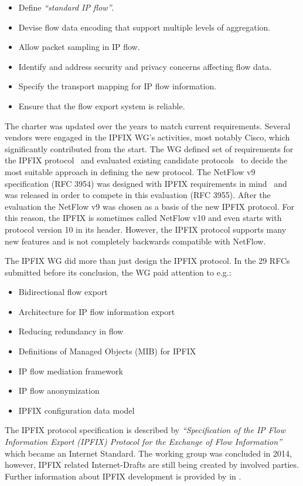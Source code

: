 \begin{itemize}
    \item Define \emph{``standard IP flow''}.
    \item Devise flow data encoding that support multiple levels of aggregation.
    \item Allow packet sampling in IP flow.
    \item Identify and address security and privacy concerns affecting flow data.
    \item Specify the transport mapping for IP flow information.
    \item Ensure that the flow export system is reliable.
\end{itemize}

The charter was updated over the years to match current requirements. Several vendors were engaged in the IPFIX WG’s activities, most notably Cisco, which significantly contributed from the start. The WG defined set of requirements for the IPFIX protocol~\cite{rfc3917} and evaluated existing candidate protocols~\cite{rfc3955} to decide the most suitable approach in defining the new protocol. The NetFlow v9 specification (RFC 3954) was designed with IPFIX requirements in mind~\cite{Trammell-2011-Introduction} and was released in order to compete in this evaluation (RFC 3955). After the evaluation the NetFlow v9 was chosen as a basis of the new IPFIX protocol. For this reason, the IPFIX is sometimes called NetFlow v10 and even starts with protocol version 10 in its header. However, the IPFIX protocol supports many new features and is not completely backwards compatible with NetFlow.

The IPFIX WG did more than just design the IPFIX protocol. In the 29 RFCs submitted before its conclusion, the WG paid attention to e.g.:
\begin{itemize}
    \item Bidirectional flow export~\cite{rfc5103}
    \item Architecture for IP flow information export~\cite{rfc5470}
    \item Reducing redundancy in flow~\cite{rfc5473}
    \item Definitions of Managed Objects (MIB) for IPFIX~\cite{rfc5815, rfc6615, rfc8038}
    \item IP flow mediation framework~\cite{rfc5982, rfc6183}
    \item IP flow anonymization~\cite{rfc6235}
    \item IPFIX configuration data model~\cite{rfc6728}
\end{itemize}
The IPFIX protocol specification is described by \emph{``Specification of the IP Flow Information Export (IPFIX) Protocol for the Exchange of Flow Information''}~\cite{rfc7011} which became an Internet Standard. The working group was concluded in 2014, however, IPFIX related Internet-Drafts are still being created by involved parties. Further information about IPFIX development is provided by \citeauthor{Brownlee-2011-Flow} in \cite{Brownlee-2011-Flow}.

